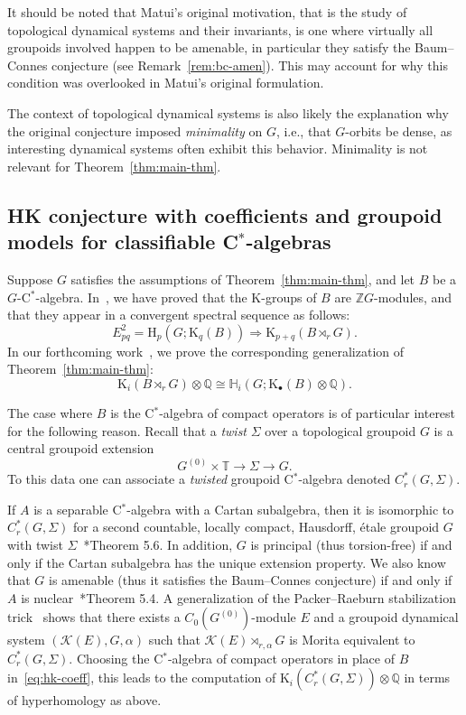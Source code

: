 \documentclass[a4paper,reqno]{amsart}
\theoremstyle{plain}
\theoremstyle{definition}
\theoremstyle{remark}
\numberwithin{equation}{section}
\newcommand{\rH}{\mathrm{H}}
\newcommand{\rK}{\mathrm{K}}
\newcommand{\cK}{\mathcal{K}}
\newcommand{\dH}{\mathbb{H}}
\newcommand{\dQ}{\mathbb{Q}}
\newcommand{\dT}{\mathbb{T}}
\newcommand{\dZ}{\mathbb{Z}}
\begin{document}
It should be noted that Matui's original motivation, that is the study of topological dynamical systems and their invariants, is one where virtually all groupoids involved happen to be amenable, in particular they satisfy the Baum--Connes conjecture (see Remark~\ref{rem:bc-amen}).
This may account for why this condition was overlooked in Matui's original formulation.

The context of topological dynamical systems is also likely the explanation why the original conjecture imposed \emph{minimality} on $G$, i.e., that $G$-orbits be dense, as interesting dynamical systems often exhibit this behavior. Minimality is not relevant for Theorem~\ref{thm:main-thm}.

\subsection{HK conjecture with coefficients and groupoid models for classifiable C$^*$-algebras}\label{sec:hk-coeff}

Suppose $G$ satisfies the assumptions of Theorem~\ref{thm:main-thm}, and let $B$ be a $G$-C$^*$-algebra.
In~\cite{py:part-one}, we have proved that the $\rK$-groups of $B$ are $\dZ G$-modules, and that they appear in a convergent spectral sequence as follows:
\[
E^2_{pq}=\rH_p(G; \rK_q(B))\Rightarrow \rK_{p+q}(B\rtimes_r G).
\]
In our forthcoming work~\cite{py:upcoming}, we prove the corresponding generalization of Theorem~\ref{thm:main-thm}:
\begin{equation}\label{eq:hk-coeff}
\rK_i(B\rtimes_r G)\otimes \dQ \cong \dH_i(G; \rK_\bullet(B)\otimes \dQ).
\end{equation}

The case where $B$ is the C$^*$-algebra of compact operators is of particular interest for the following reason. Recall that a \emph{twist} $\Sigma$ over a topological groupoid $G$ is a central groupoid extension
\[
G^{(0)} \times \dT \longrightarrow \Sigma \longrightarrow G.
\]
To this data one can associate a \emph{twisted} groupoid C$^*$-algebra denoted $C^*_r(G,\Sigma)$.

If $A$ is a separable C$^*$-algebra with a Cartan subalgebra, then it is isomorphic to $C^*_r(G,\Sigma)$ for a second countable, locally compact, Hausdorff, étale groupoid $G$ with twist $\Sigma$~\cite{ren:cartan}*{Theorem 5.6}. In addition, $G$ is principal (thus torsion-free) if and only if the Cartan subalgebra has the unique extension property. We also know that $G$ is amenable (thus it satisfies the Baum--Connes conjecture) if and only if $A$ is nuclear~\cite{tak:fell}*{Theorem 5.4}. A generalization of the Packer--Raeburn stabilization trick~\cite{willerp:parae} shows that there exists a $C_0(G^{(0)})$-module $E$ and a groupoid dynamical system $(\cK(E), G, \alpha)$ such that $\cK(E)\rtimes_{r,\alpha} G$ is Morita equivalent to $C^*_r(G,\Sigma)$. Choosing the C$^*$-algebra of compact operators in place of $B$ in~\eqref{eq:hk-coeff}, this leads to the computation of $\rK_i(C^*_r(G,\Sigma)) \otimes \dQ$ in terms of hyperhomology as above.
\end{document}
